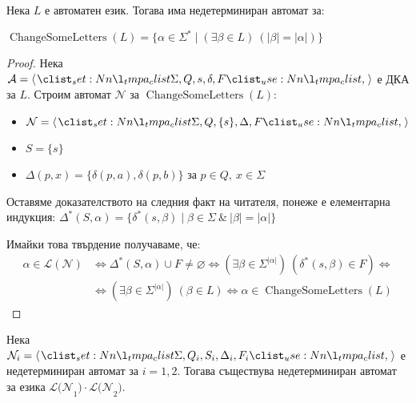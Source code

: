 \begin{claim}
    Нека $L$ е автоматен език.
    Тогава има недетерминиран автомат за:
    \begin{center}
        $\operatorname{ChangeSomeLetters}(L) = \{ \alpha \in \Sigma^* \mid (\exists \beta \in L) \: (|\beta| = |\alpha| ) \}$
    \end{center}
\end{claim}

\begin{proof}
    Нека $\mathcal{A} = \opair{\Sigma, Q, s, \delta, F}$ е ДКА за $L$.
    Строим автомат $\mathcal{N}$ за $\operatorname{ChangeSomeLetters}(L)$:
    \begin{itemize}
        \item $\mathcal{N} = \opair{\Sigma, Q, \{ s \}, \Delta, F}$
        \item $S = \{ s \}$
        \item $\Delta(p, x) = \{ \delta(p, a), \delta(p, b) \}$ за $p \in Q, \: x \in \Sigma$
    \end{itemize}

    Оставяме доказателството на следния факт на читателя, понеже е елементарна индукция:
    $\Delta^*(S, \alpha) = \{ \delta^*(s, \beta) \mid \beta \in \Sigma \: \& \: |\beta| = |\alpha| \}$

    Имайки това твърдение получаваме, че:
    \begin{align*}
        \alpha \in \mathcal{L(N)} & \iff \Delta^*(S, \alpha) \cup F \neq \varnothing \iff (\exists \beta \in \Sigma^{|\alpha|}) \: (\delta^*(s, \beta) \in F) \iff \\
                                  & \iff (\exists \beta \in \Sigma^{|\alpha|}) \: (\beta \in L) \iff \alpha \in \operatorname{ChangeSomeLetters}(L)
    \end{align*}
\end{proof}

\begin{claim}
    Нека $\mathcal{N}_i = \opair{\Sigma, Q_i, S_i, \Delta_i, F_i}$  е недетерминиран автомат за $i = 1, 2$.
    Тогава съществува недетерминиран автомат за езика $\mathcal{L(N}_1) \cdot \mathcal{L(N}_2)$.
\end{claim}

